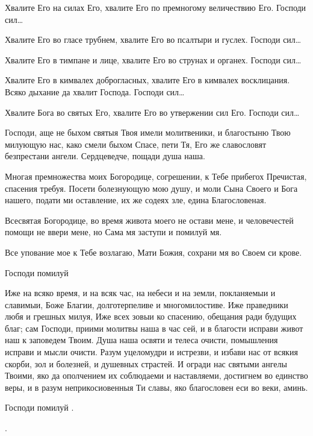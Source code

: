 \begin{mymulticols}


 Хвалите Его на силах Его, хвалите Его по премногому величествию Его. Господи сил…


 Хвалите Его во гласе трубнем, хвалите Его во псалтыри и гуслех. Господи сил…


 Хвалите Его в тимпане и лице, хвалите Его во струнах и органех. Господи сил…


 Хвалите Его в кимвалех доброгласных, хвалите Его в кимвалех восклицания. Всяко дыхание да хвалит Господа. Господи сил…


 Хвалите Бога во святых Его, хвалите Его во утвержении сил Его. Господи сил…


 Господи, аще не быхом святыя Твоя имели молитвеники, и благостыню Твою милующую нас, како смели быхом Спасе, пети Тя, Его же славословят безпрестани ангели. Сердцеведче, пощади душа наша.

 Многая премножества моих Богородице, согрешении, к Тебе прибегох Пречистая, спасения требуя. Посети болезнующую мою душу, и моли Сына Своего и Бога нашего, подати ми оставление, их же содеях зле, едина Благословеная.

Всесвятая Богородице, во время живота моего не остави мене, и человечестей помощи не ввери мене, но Сама мя заступи и помилуй мя.

Все упование мое к Тебе возлагаю, Мати Божия, сохрани мя во Своем си крове.

Господи помилуй 

Иже на всяко время, и на всяк час, на небеси и на земли, покланяемыи и славимыи, Боже Благии, долготерпеливе и многомилостиве. Иже праведники любя и грешных милуя, Иже всех зовыи ко спасению, обещания ради будущих благ; сам Господи, приими молитвы наша в час сей, и в благости исправи живот наш к заповедем Твоим. Душа наша освяти и телеса очисти, помышления исправи и мысли очисти. Разум уцеломудри и истрезви, и избави нас от всякия скорби, зол и болезней, и душевных страстей. И огради нас святыми ангелы Твоими, яко да ополчением их соблюдаеми и наставляеми, достигнем во единство веры, и в разум неприкосиовенныя Ти славы, яко благословен еси во веки, аминь.

Господи помилуй .

.


\end{mymulticols}
